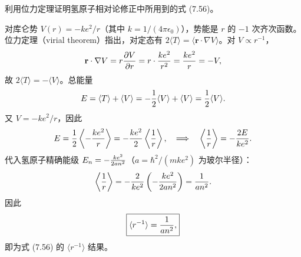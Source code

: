 \begin{question}
利用位力定理证明氢原子相对论修正中所用到的式 (7.56)。

\par\smallskip
{}

\end{question}
\begin{solution}
对库仑势 $V(r)=-ke^2/r$（其中 $k=1/(4\pi\epsilon_0)$），势能是 $r$ 的 $-1$ 次齐次函数。位力定理（virial theorem）指出，对定态有 $2\langle T\rangle = \langle\mathbf r\cdot\nabla V\rangle$。对 $V\propto r^{-1}$，
\[
\mathbf r\cdot\nabla V = r{\partial V\over\partial r}=r\cdot{ke^2\over r^2}={ke^2\over r}=-V,
\]
故 $2\langle T\rangle = -\langle V\rangle$。总能量
\[
E=\langle T\rangle+\langle V\rangle
= -\frac12\langle V\rangle+\langle V\rangle
= {1\over2}\langle V\rangle.
\]
又 $V=-ke^2/r$，因此
\[
E={1\over2}\left\langle -{ke^2\over r}\right\rangle
=-{ke^2\over2}\left\langle{1\over r}\right\rangle,
\quad\Longrightarrow\quad
\left\langle{1\over r}\right\rangle=-{2E\over ke^2}.
\]
代入氢原子精确能级 $E_n=-{ke^2\over2a n^2}$（$a=\hbar^2/(mke^2)$ 为玻尔半径）：
\[
\left\langle{1\over r}\right\rangle
=-{2\over ke^2}\left(-{ke^2\over2a n^2}\right)
={1\over a n^2}.
\]
因此
\[
\boxed{\langle r^{-1}\rangle={1\over an^2},}
\]
即为式 (7.56) 的 $\langle r^{-1}\rangle$ 结果。
\end{solution}

